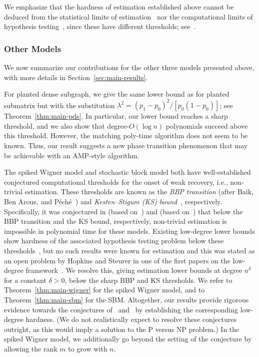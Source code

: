 \documentclass[11pt]{article}
\begin{document}
We emphasize that the hardness of estimation established above cannot be deduced from the statistical limits of estimation~\cite{kolar-info,BIS-info} nor the computational limits of hypothesis testing~\cite{MW-reduction,BBH-reduction}, since these have different thresholds; see~\cite{SW-estimation}.



\subsubsection{Other Models}

We now summarize our contributions for the other three models presented above, with more details in Section~\ref{sec:main-results}.

For planted dense subgraph, we give the same lower bound as for planted submatrix but with the substitution $\lambda^2 = (p_1 - p_0)^2/[p_0(1-p_0)]$; see Theorem~\ref{thm:main-pds}. In particular, our lower bound reaches a sharp threshold, and we also show that degree-$O(\log n)$ polynomials succeed above this threshold. However, the matching poly-time algorithm does not seem to be known. Thus, our result suggests a new phase transition phenomenon that may be achievable with an AMP-style algorithm. 

The spiked Wigner model and stochastic block model both have well-established conjectured computational thresholds for the onset of weak recovery, i.e., non-trivial estimation. These thresholds are known as the \emph{BBP transition} (after Baik, Ben Arous, and P\'{e}ch\'{e}~\cite{BBP}) and \emph{Kesten--Stigum (KS) bound}~\cite{KestenStigum:66, decelle}, respectively. Specifically, it was conjectured in \cite[Conjecture 10]{LM-wigner} (based on~\cite{LKZ-sparse,mi-rank-1}) and \cite[Conjecture 2]{AS-acyclic} (based on~\cite{decelle}) that below the BBP transition and the KS bound, respectively, non-trivial estimation is impossible in polynomial time for these models. Existing low-degree lower bounds show hardness of the associated hypothesis testing problem below these thresholds~\cite{HS-bayesian,ld-notes,spectral-planting}, but no such results were known for estimation and this was stated as an open problem by Hopkins and Steurer in one of the first papers on the low-degree framework~\cite{HS-bayesian}. We resolve this, giving estimation lower bounds at degree $n^\delta$ for a constant $\delta > 0$, below the sharp BBP and KS thresholds. We refer to Theorem~\ref{thm:main-wigner} for the spiked Wigner model, and to Theorem~\ref{thm:main-sbm} for the SBM. Altogether, our results provide rigorous evidence towards the conjectures of~\cite{LM-wigner} and~\cite{AS-acyclic} by establishing the corresponding low-degree hardness. (We do not realistically expect to resolve these conjectures outright, as this would imply a solution to the P versus NP problem.) In the spiked Wigner model, we additionally go beyond the setting of the conjecture by allowing the rank $m$ to grow with $n$.
\end{document}
